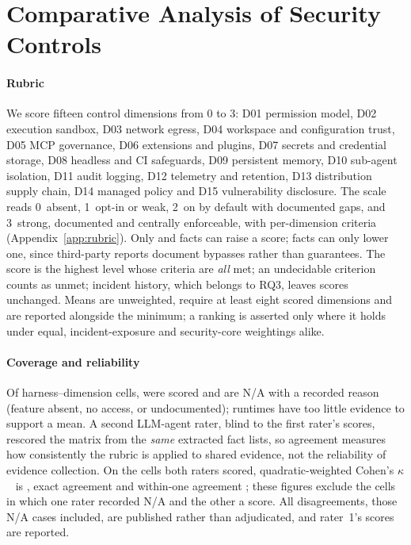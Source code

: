 \section{Comparative Analysis of Security Controls}\label{sec:controls}

\paragraph*{Rubric} We score fifteen control dimensions from 0 to 3: D01 permission model, D02 execution sandbox, D03 network egress, D04 workspace and configuration trust, D05 MCP governance, D06 extensions and plugins, D07 secrets and credential storage, D08 headless and CI safeguards, D09 persistent memory, D10 sub-agent isolation, D11 audit logging, D12 telemetry and retention, D13 distribution supply chain, D14 managed policy and D15 vulnerability disclosure. The scale reads 0~absent, 1~opt-in or weak, 2~on by default with documented gaps, and 3~strong, documented and centrally enforceable, with per-dimension criteria (Appendix~\ref{app:rubric}). Only \evD{} and \evT{} facts can raise a score; \evTP{} facts can only lower one, since third-party reports document bypasses rather than guarantees. The score is the highest level whose criteria are \emph{all} met; an undecidable criterion counts as unmet; incident history, which belongs to RQ3, leaves scores unchanged. Means are unweighted, require at least eight scored dimensions and are reported alongside the minimum; a ranking is asserted only where it holds under equal, incident-exposure and security-core weightings alike.

\paragraph*{Coverage and reliability} Of \nCells{} harness--dimension cells, \nCellsScored{} were scored and \nCellsNA{} are N/A with a recorded reason (feature absent, no access, or undocumented); \nInsufficientEOne{} runtimes have too little evidence to support a mean. A second LLM-agent rater, blind to the first rater's scores, rescored the matrix from the \emph{same} extracted fact lists, so agreement measures how consistently the rubric is applied to shared evidence, not the reliability of evidence collection. On the \nOverlapEOne{} cells both raters scored, quadratic-weighted Cohen's $\kappa$~\cite{cohen1968} is \kappaEOne{}, exact agreement \exactEOne{} and within-one agreement \withinOneEOne{}; these figures exclude the \naVsScoreEOne{} cells in which one rater recorded N/A and the other a score. All \nDisagreeEOne{} disagreements, those N/A cases included, are published rather than adjudicated, and rater~1's scores are reported.


